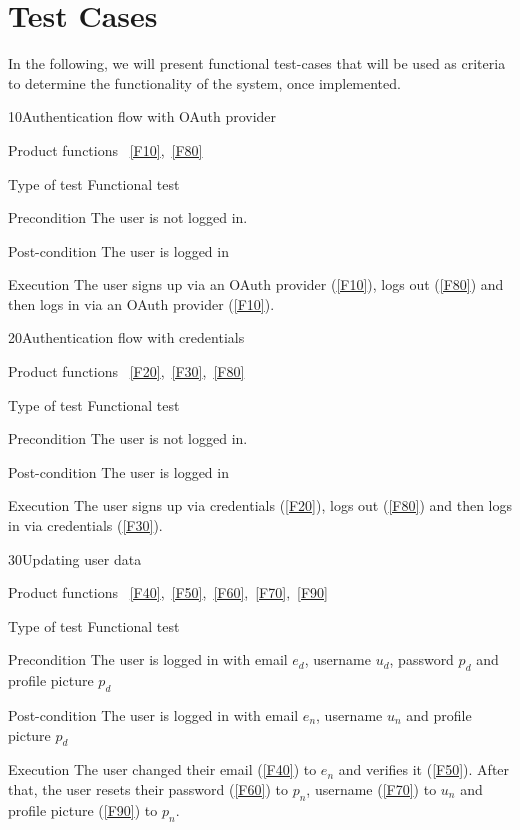\chapter{Test Cases}
\label{ch:test}

In the following, we will present functional test-cases that will be used as criteria to determine the functionality of the system, once implemented.

\begin{testcase}{10}{Authentication flow with OAuth provider}
  \item[Product functions]~\ref{F10},~\ref{F80}
  \item[Type of test] Functional test
  \item[Precondition] The user is not logged in.
  \item[Post-condition] The user is logged in
  \item[Execution] The user signs up via an OAuth provider (\ref{F10}), logs out (\ref{F80}) and then logs in via an OAuth provider (\ref{F10}).
\end{testcase}

\begin{testcase}{20}{Authentication flow with credentials}
  \item[Product functions]~\ref{F20},~\ref{F30},~\ref{F80}
  \item[Type of test] Functional test
  \item[Precondition] The user is not logged in.
  \item[Post-condition] The user is logged in
  \item[Execution] The user signs up via credentials (\ref{F20}), logs out (\ref{F80}) and then logs in via credentials (\ref{F30}).
\end{testcase}

\begin{testcase}{30}{Updating user data}
  \item[Product functions]~\ref{F40},~\ref{F50},~\ref{F60},~\ref{F70},~\ref{F90}
  \item[Type of test] Functional test
  \item[Precondition] The user is logged in with email $e_d$, username $u_d$, password $p_d$ and profile picture $p_d$
  \item[Post-condition] The user is logged in with email $e_n$, username $u_n$ and profile picture $p_d$
  \item[Execution] The user changed their email (\ref{F40}) to $e_n$ and verifies it (\ref{F50}).
    After that, the user resets their password (\ref{F60}) to $p_n$, username (\ref{F70}) to $u_n$ and profile picture (\ref{F90}) to $p_n$.
\end{testcase}

